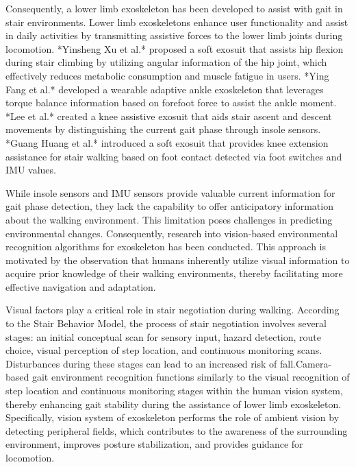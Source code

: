 \documentclass[journal,article,submit,pdftex,moreauthors]{Definitions/mdpi}
\begin{document}
Consequently, a lower limb exoskeleton has been developed to assist with gait in stair environments. Lower limb exoskeletons enhance user functionality and assist in daily activities by transmitting assistive forces to the lower limb joints during locomotion. *Yinsheng Xu et al.* proposed a soft exosuit that assists hip flexion during stair climbing by utilizing angular information of the hip joint, which effectively reduces metabolic consumption and muscle fatigue in users. *Ying Fang et al.* developed a wearable adaptive ankle exoskeleton that leverages torque balance information based on forefoot force to assist the ankle moment. *Lee et al.* created a knee assistive exosuit that aids stair ascent and descent movements by distinguishing the current gait phase through insole sensors. *Guang Huang et al.* introduced a soft exosuit that provides knee extension assistance for stair walking based on foot contact detected via foot switches and IMU values.

While insole sensors and IMU sensors provide valuable current information for gait phase detection, they lack the capability to offer anticipatory information about the walking environment. This limitation poses challenges in  predicting environmental changes. Consequently, research into vision-based environmental recognition algorithms for exoskeleton has been conducted. This approach is motivated by the observation that humans inherently utilize visual information to acquire prior knowledge of their walking environments, thereby facilitating more effective navigation and adaptation.

Visual factors play a critical role in stair negotiation during walking. According to the Stair Behavior Model, the process of stair negotiation involves several stages: an initial conceptual scan for sensory input, hazard detection, route choice, visual perception of step location, and continuous monitoring scans. Disturbances during these stages can lead to an increased risk of fall.Camera-based gait environment recognition functions similarly to the visual recognition of step location and continuous monitoring stages within the human vision system, thereby enhancing gait stability during the assistance of lower limb exoskeleton. Specifically,  vision system of exoskeleton performs the role of ambient vision by detecting peripheral fields, which contributes to the awareness of the surrounding environment, improves posture stabilization, and provides guidance for locomotion.
\end{document}
